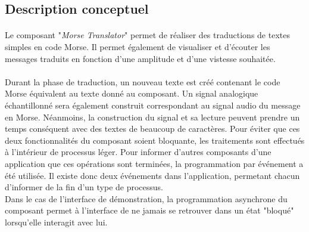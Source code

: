 \documentclass[a4paper,11pt]{article}
\begin{document}
    \subsection{Description conceptuel}
    \paragraph{}
    Le composant "\textit{Morse Translator}" permet de réaliser des traductions de textes simples en code Morse. Il permet également de visualiser et d'écouter les messages traduits en fonction d'une amplitude et d'une vistesse souhaitée.
    \paragraph{}
    Durant la phase de traduction, un nouveau texte est créé contenant le code Morse équivalent au texte donné au composant. Un signal analogique échantillonné sera également construit correspondant au signal audio du message en Morse. Néanmoins, la construction du signal et sa lecture peuvent prendre un temps conséquent avec des textes de beaucoup de caractères. Pour éviter que ces deux fonctionnalités du composant soient bloquante, les traitements sont effectués à l'intérieur de processus léger. Pour informer d'autres composants d'une application que ces opérations sont terminées, la programmation par événement a été utilisée. Il existe donc deux événements dans l'application, permetant chacun d'informer de la fin d'un type de processus.\\
    Dans le cas de l'interface de démonstration, la programmation asynchrone du composant permet à l'interface de ne jamais se retrouver dans un état "bloqué" lorsqu'elle interagit avec lui.
\end{document}
